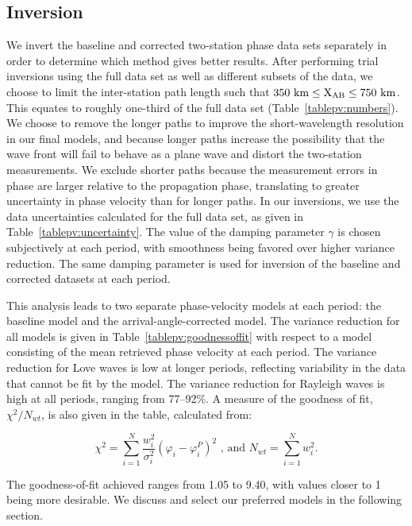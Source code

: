 \documentclass[12pt,oneside]{book}
\begin{document}
\subsection{Inversion}\label{sec:analysisinversion}
We invert the baseline and corrected two-station phase data sets separately in order to determine which method gives better results. After performing trial inversions using the full data set as well as different subsets of the data, we choose to limit the inter-station path length such that $350~\rm{km} \leq X_{AB} \leq 750~\rm{km}$. This equates to roughly one-third of the full data set (Table~\ref{tablepv:numbers}). We choose to remove the longer paths to improve the short-wavelength resolution in our final models, and because longer paths increase the possibility that the wave front will fail to behave as a plane wave and distort the two-station measurements. We exclude shorter paths because the measurement errors in phase are larger relative to the propagation phase, translating to greater uncertainty in phase velocity than for longer paths. In our inversions, we use the data uncertainties calculated for the full data set, as given in Table~\ref{tablepv:uncertainty}. The value of the damping parameter $\gamma$ is chosen subjectively at each period, with smoothness being favored over higher variance reduction. The same damping parameter is used for inversion of the baseline and corrected datasets at each period. 

This analysis leads to two separate phase-velocity models at each period: the baseline model and the arrival-angle-corrected model. The variance reduction for all models is given in Table~\ref{tablepv:goodnessoffit} with respect to a model consisting of the mean retrieved phase velocity at each period. The variance reduction for Love waves is low at longer periods, reflecting variability in the data that cannot be fit by the model. The variance reduction for Rayleigh waves is high at all periods, ranging from 77--92\%. A measure of the goodness of fit, $\chi^2/N_{wt}$, is also given in the table, calculated from:
\begin{linenomath*}
\begin{equation}\label{eqpv:goodnessoffit}
\chi^2 = \sum_{i=1}^{N}{\frac{w_i^2}{\sigma_i^2} \left( \varphi_i - \varphi_i^P \right)^2} 
\text{ , and } N_{wt} = \sum_{i=1}^{N}{w_i^2}.
\end{equation}
\end{linenomath*}
The goodness-of-fit achieved ranges from 1.05 to 9.40, with values closer to 1 being more desirable. We discuss and select our preferred models in the following section. 
\end{document}
